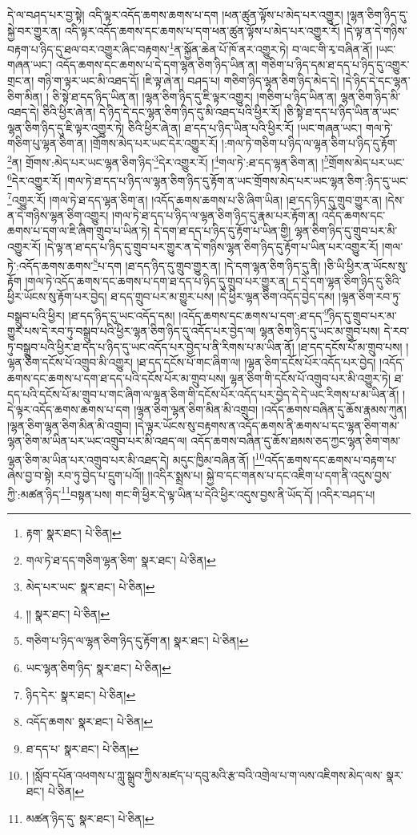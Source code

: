 དེ་ལ་བཤད་པར་བྱ་སྟེ། འདི་ལྟར་འདོད་ཆགས་ཆགས་པ་དག །ཕན་ཚུན་ལྟོས་པ་མེད་པར་འགྱུར། །ལྷན་ཅིག་ཉིད་དུ་སྐྱེ་བར་གྱུར་ན། འདི་ལྟར་འདོད་ཆགས་དང་ཆགས་པ་དག་ཕན་ཚུན་ལྟོས་པ་མེད་པར་འགྱུར་རོ། །དེ་ལྟ་ན་དེ་གཉིས་བརྟག་པ་ཉིད་དུ་ཐལ་བར་འགྱུར་ཞིང་བརྟགས་\footnote{རྟག་  སྣར་ཐང་།  པེ་ཅིན། }ན་སྐྱོན་ཆེན་པོ་ཁོ་ནར་འགྱུར་ཏེ། བ་ལང་གི་རྭ་བཞིན་ནོ། །ཡང་གཞན་ཡང་། འདོད་ཆགས་དང་ཆགས་པ་དེ་དག་ལྷན་ཅིག་ཉིད་ཡིན་ན། གཅིག་པ་ཉིད་དམ་ཐ་དད་པ་ཉིད་དུ་འགྱུར་གྲང་ན། གཉི་ག་ལྟར་ཡང་མི་འཐད་དོ། །ཇི་ལྟ་ཞེ་ན། བཤད་པ། གཅིག་ཉིད་ལྷན་ཅིག་ཉིད་མེད་དེ། །དེ་ཉིད་དེ་དང་ལྷན་ཅིག་མིན། །
ཅི་སྟེ་ཐ་དད་ཉིད་ཡིན་ན། །ལྷན་ཅིག་ཉིད་དུ་ཇི་ལྟར་འགྱུར། །གཅིག་པ་ཉིད་ཡིན་ན། ལྷན་ཅིག་ཉིད་མི་འཐད་དེ། ཅིའི་ཕྱིར་ཞེ་ན། དེ་ཉིད་དེ་དང་ལྷན་ཅིག་ཉིད་དུ་མི་འཐད་པའི་ཕྱིར་རོ། །ཅི་སྟེ་ཐ་དད་པ་ཉིད་ཡིན་ན་ཡང་ལྷན་ཅིག་ཉིད་དུ་ཇི་ལྟར་འགྱུར་ཏེ། ཅིའི་ཕྱིར་ཞེ་ན། ཐ་དད་པ་ཉིད་ཡིན་པའི་ཕྱིར་རོ། །ཡང་གཞན་ཡང་། གལ་ཏེ་གཅིག་པུ་ལྷན་ཅིག་ན། །གྲོགས་མེད་པར་ཡང་དེར་འགྱུར་རོ། །:གལ་ཏེ་གཅིག་པ་ཉིད་ལ་ལྷན་ཅིག་པ་ཉིད་དུ་རྟོག་\footnote{གལ་ཏེ་ཐ་དད་གཅིག་ལྷན་ཅིག་  སྣར་ཐང་།  པེ་ཅིན། }ན། གྲོགས་:མེད་པར་ཡང་ལྷན་ཅིག་ཉིད་\footnote{མེད་པར་ཡང་  སྣར་ཐང་།  པེ་ཅིན། }དེར་འགྱུར་རོ། །\footnote{།།  སྣར་ཐང་།  པེ་ཅིན། }གལ་ཏེ་:ཐ་དད་ལྷན་ཅིག་ན། །\footnote{གཅིག་པ་ཉིད་ལ་ལྷན་ཅིག་ཉིད་དུ་རྟོག་ན།   སྣར་ཐང་།  པེ་ཅིན། }གྲོགས་མེད་པར་ཡང་\footnote{ཡང་ལྷན་ཅིག་ཉིད་  སྣར་ཐང་།  པེ་ཅིན། }དེར་འགྱུར་རོ། །གལ་ཏེ་ཐ་དད་པ་ཉིད་ལ་ལྷན་ཅིག་ཉིད་དུ་རྟོག་ན་ཡང་གྲོགས་མེད་པར་ཡང་ལྷན་ཅིག་:ཉིད་དུ་ཡང་\footnote{ཉིད་དེར་  སྣར་ཐང་།  པེ་ཅིན། }འགྱུར་རོ། །གལ་ཏེ་ཐ་དད་ལྷན་ཅིག་ན། །འདོད་ཆགས་ཆགས་པ་ཅི་ཞིག་ཡིན། །ཐ་དད་ཉིད་དུ་གྲུབ་གྱུར་ན། །དེས་ན་དེ་གཉིས་ལྷན་ཅིག་འགྱུར། །གལ་ཏེ་ཐ་དད་པ་ཉིད་ལ་ལྷན་ཅིག་ཉིད་དུ་རྣམ་པར་རྟོག་ན། འདོད་ཆགས་དང་ཆགས་པ་དག་ལ་ཇི་ཞིག་གྲུབ་པ་ཡིན་ཏེ། དེ་དག་ཐ་དད་པ་ཉིད་དུ་རྟོག་པ་ཡིན་གྱི། ལྷན་ཅིག་ཉིད་དུ་གྲུབ་པར་མི་འགྱུར་རོ། །དེ་ལྟ་ན་ཐ་དད་པ་ཉིད་དུ་གྲུབ་པར་གྱུར་ན་དེ་གཉིས་ལྷན་ཅིག་ཉིད་དུ་རྟོག་པ་ཡིན་པར་འགྱུར་རོ། །གལ་ཏེ་:འདོད་ཆགས་ཆགས་\footnote{འདོད་ཆགས་  སྣར་ཐང་།  པེ་ཅིན། }པ་དག །ཐ་དད་ཉིད་དུ་གྲུབ་གྱུར་ན། །དེ་དག་ལྷན་ཅིག་ཉིད་དུ་ནི། །ཅི་ཡི་ཕྱིར་ན་ཡོངས་སུ་རྟོག །གལ་ཏེ་འདོད་ཆགས་དང་ཆགས་པ་དག་ཐ་དད་པ་ཉིད་དུ་གྲུབ་པར་གྱུར་ན། ད་དེ་དག་ལྷན་ཅིག་ཉིད་དུ་ཅིའི་ཕྱིར་ཡོངས་སུ་རྟོག་པར་བྱེད། ཐ་དད་གྲུབ་པར་མ་གྱུར་པས། །དེ་ཕྱིར་ལྷན་ཅིག་འདོད་བྱེད་དམ། །ལྷན་ཅིག་རབ་ཏུ་བསྒྲུབ་པའི་ཕྱིར། །ཐ་དད་ཉིད་དུ་ཡང་འདོད་དམ། །འདོད་ཆགས་དང་ཆགས་པ་དག་:ཐ་དད་\footnote{ཐ་དད་པ་  སྣར་ཐང་།  པེ་ཅིན། }ཉིད་དུ་གྲུབ་པར་མ་གྱུར་པས་དེ་རབ་ཏུ་བསྒྲུབ་པའི་ཕྱིར་ལྷན་ཅིག་ཉིད་དུ་འདོད་པར་བྱེད་ལ། ལྷན་ཅིག་ཉིད་དུ་ཡང་མ་གྲུབ་པས། དེ་རབ་ཏུ་བསྒྲུབ་པའི་ཕྱིར་ཐ་དད་པ་ཉིད་དུ་ཡང་འདོད་པར་བྱེད་པ་ནི་རིགས་པ་མ་ཡིན་ནོ། །ཐ་དད་དངོས་པོ་མ་གྲུབ་པས། །ལྷན་ཅིག་དངོས་པོ་འགྲུབ་མི་འགྱུར། །ཐ་དད་དངོས་པོ་གང་ཞིག་ལ། །ལྷན་ཅིག་དངོས་པོར་འདོད་པར་བྱེད། །འདོད་ཆགས་དང་ཆགས་པ་དག་ཐ་དད་པའི་དངོས་པོར་མ་གྲུབ་པས། ལྷན་ཅིག་གི་དངོས་པོ་འགྲུབ་པར་མི་འགྱུར་ཏེ། ཐ་དད་པའི་དངོས་པོ་མ་གྲུབ་པ་གང་ཞིག་ལ་ལྷན་ཅིག་གི་དངོས་པོར་འདོད་པར་བྱེད་དེ་དེ་ཡང་རིགས་པ་མ་ཡིན་ནོ། །དེ་ལྟར་འདོད་ཆགས་ཆགས་པ་དག །ལྷན་ཅིག་ལྷན་ཅིག་མིན་མི་འགྲུབ། །འདོད་ཆགས་བཞིན་དུ་ཆོས་རྣམས་ཀུན། །ལྷན་ཅིག་ལྷན་ཅིག་མིན་མི་འགྲུབ། །དེ་ལྟར་ཡོངས་སུ་བརྟགས་ན་འདོད་ཆགས་ནི་ཆགས་པ་དང་ལྷན་ཅིག་གམ་ལྷན་ཅིག་མ་ཡིན་པར་ཡང་འགྲུབ་པར་མི་འཐད་ལ། འདོད་ཆགས་བཞིན་དུ་ཆོས་ཐམས་ཅད་ཀྱང་ལྷན་ཅིག་གམ་ལྷན་ཅིག་མ་ཡིན་པར་འགྲུབ་པར་མི་འཐད་དེ། མདུང་ཁྱིམ་བཞིན་ནོ། །\footnote{། །སློབ་དཔོན་འཕགས་པ་ཀླུ་སྒྲུབ་ཀྱིས་མཛད་པ་དབུ་མའི་རྩ་བའི་འགྲེལ་པ་ག་ལས་འཇིགས་མེད་ལས་  སྣར་ཐང་།  པེ་ཅིན། }འདོད་ཆགས་དང་ཆགས་པ་བརྟག་པ་ཞེས་བྱ་བ་སྟེ། རབ་ཏུ་བྱེད་པ་དྲུག་པའོ།། །།འདིར་སྨྲས་པ། སྐྱེ་བ་དང་གནས་པ་དང་འཇིག་པ་དག་ནི་འདུས་བྱས་ཀྱི་:མཚན་ཉིད་\footnote{མཚན་ཉིད་དུ་  སྣར་ཐང་།  པེ་ཅིན། }བསྟན་པས། གང་གི་ཕྱིར་དེ་ལྟ་ཡིན་པ་དེའི་ཕྱིར་འདུས་བྱས་ནི་ཡོད་དོ། །འདིར་བཤད་པ། 